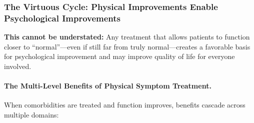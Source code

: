 \subsubsection{The Virtuous Cycle: Physical Improvements Enable Psychological Improvements}

\textbf{This cannot be understated:} Any treatment that allows patients to function closer to ``normal''---even if still far from truly normal---creates a favorable basis for psychological improvement and may improve quality of life for everyone involved.

\paragraph{The Multi-Level Benefits of Physical Symptom Treatment.}

When comorbidities are treated and function improves, benefits cascade across multiple domains:

